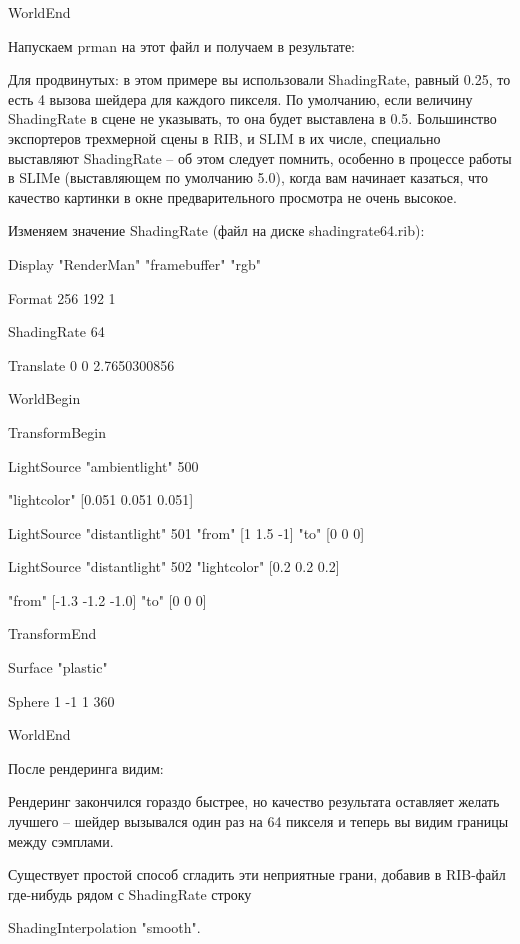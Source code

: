 WorldEnd
  

 Напускаем prman на этот файл и получаем в результате:
  

  

 Для
    продвинутых: в этом примере вы
    использовали ShadingRate, равный 0.25, то есть 4 вызова шейдера для
    каждого пикселя. По умолчанию, если величину ShadingRate в сцене не
    указывать, то она будет выставлена в 0.5. Большинство экспортеров
    трехмерной сцены  в
    RIB,  и SLIM в их
    числе, специально выставляют ShadingRate – об этом следует помнить,
    особенно в процессе работы в SLIMе (выставляющем по умолчанию 5.0),
    когда вам начинает казаться, что качество картинки в окне
    предварительного просмотра не очень высокое.
  

 Изменяем значение ShadingRate (файл на диске
    shadingrate64.rib):
  

Display "RenderMan"
    "framebuffer" "rgb"
  

Format 256 192 1
  

ShadingRate 64
  

Translate 0 0
    2.7650300856
  

WorldBegin
  

  TransformBegin
  

    LightSource
    "ambientlight" 500
  

                "lightcolor" [0.051 0.051 0.051]
  

    LightSource
    "distantlight" 501 "from" [1 1.5 -1] "to" [0 0 0]
  

    LightSource
    "distantlight" 502 "lightcolor" [0.2 0.2 0.2]
  

                "from" [-1.3 -1.2 -1.0] "to" [0 0 0]
  

  TransformEnd
  

  Surface "plastic"
  

  Sphere 1 -1 1 360
  

WorldEnd
  

 После рендеринга видим:
  

  

 Рендеринг закончился гораздо быстрее, но качество
    результата оставляет желать лучшего – шейдер вызывался один раз на
    64 пикселя и теперь вы видим границы между сэмплами.
  

 Существует простой способ сгладить эти неприятные
    грани, добавив в RIB-файл где-нибудь рядом с ShadingRate
    строку
  

ShadingInterpolation  "smooth".
  

